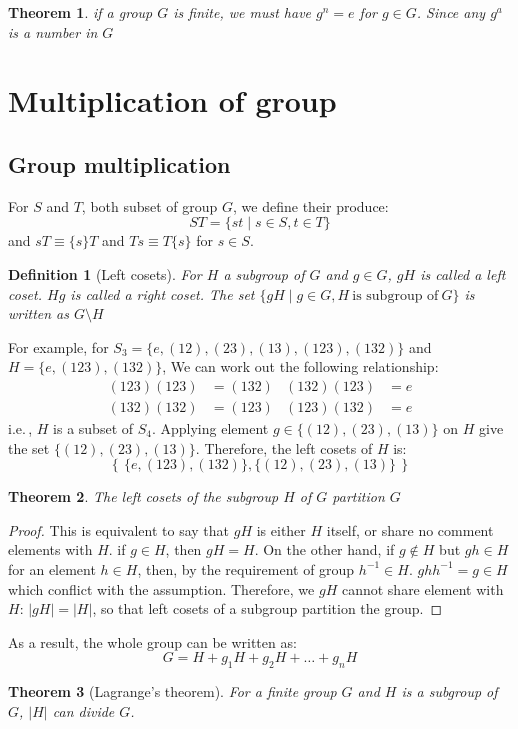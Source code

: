 \documentclass{amsart}
\newtheorem{definition}{Definition}
\newtheorem{theorem}{Theorem}
\begin{document}
\begin{theorem}
    if a group $G$ is finite, we must have $g^n = e$ for $g \in G$. Since any $g^a$ is a number in $G$
\end{theorem}

\vspace{10pt}

\section{Multiplication of group} 

\subsection*{Group multiplication}
For $S$ and $T$, both subset of group $G$, we define their produce:
\begin{equation}
    ST = \{st\mid s\in S, t \in T\}
\end{equation}
and $sT \equiv \{s\}T $ and $Ts \equiv T\{s\} $ for $s \in S$.

\vspace{10pt}

\begin{definition}[Left cosets]
    For $H$ a subgroup of $G$ and $g \in G$, $gH$ is called a left coset. $Hg$ is called a right coset. 
    The set $\{gH \mid g \in G, H\ \text{is subgroup of}\ G\}$ is written as $G\setminus H$
\end{definition}

For example, for $S_3 = \{e, (12), (23), (13), (123), (132)\}$ 
and $H = \{e,(123),(132)\}$, We can work out the following relationship:
\begin{align*}
    (123)(123) &= (132) &  (132)(123) &= e \\
    (132)(132) &= (123) &  (123)(132) &= e 
\end{align*}
i.e.\,, $H$ is a subset of $S_4$. Applying element $g \in \{(12), (23), (13)\}$ on $H$
give the set $\{(12), (23), (13)\}$. Therefore, the left cosets of $H$ is:
\[
    \left\{\, \{e,(123),(132)\}, \{(12), (23), (13)\}\, \right\}    
\]

\vspace{10pt}

\begin{theorem}
    The left cosets of the subgroup $H$ of $G$ partition $G$
\end{theorem}
\begin{proof}
    This is equivalent to say that $gH$ is either $H$ itself, or share no comment elements with $H$.
    if $g\in H$, then $gH = H$. On the other hand, 
    if $g\notin H$ but $gh \in H$ for an element $h\in H$, then, by the requirement of group $h^{-1}\in H$. $ghh^{-1} = g \in H$ which conflict with the assumption.
    Therefore, we $gH$ cannot share element with $H$: $|gH| = |H|$, so that left cosets of a subgroup partition the group.
\end{proof}
As a result, the whole group can be written as:
\[
    G = H + g_1 H + g_2 H + \dots + g_n H    
\]
\begin{theorem}[Lagrange's theorem]
    For a finite group $G$ and $H$ is a subgroup of $G$, $|H|$ can divide $G$.
\end{theorem}
\end{document}
